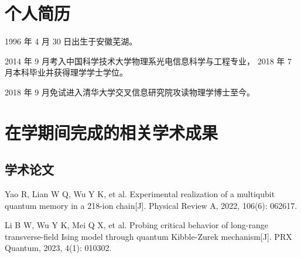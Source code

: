 
\begin{resume}

  \section*{个人简历}

  1996 年 4 月 30 日出生于安徽芜湖。

  2014 年 9 月考入中国科学技术大学物理系光电信息科学与工程专业， 2018 年 7 月本科毕业并获得理学学士学位。

  2018 年 9 月免试进入清华大学交叉信息研究院攻读物理学博士至今。


  \section*{在学期间完成的相关学术成果}

  \subsection*{学术论文}

  \begin{achievements}
    \item Yao R, Lian W Q, Wu Y K, et al. Experimental realization of a multiqubit quantum memory in a 218-ion chain[J]. Physical Review A, 2022, 106(6): 062617.
    \item Li B W, Wu Y K, Mei Q X, et al. Probing critical behavior of long-range transverse-field Ising model through quantum Kibble-Zurek mechanism[J]. PRX Quantum, 2023, 4(1): 010302.
  \end{achievements}

\end{resume}
